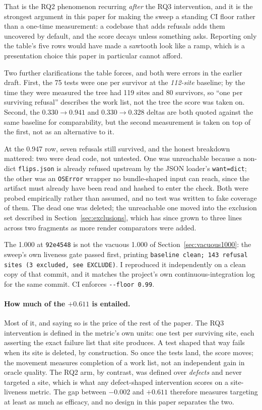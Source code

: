 \documentclass[11pt]{article}
\begin{document}
That is the RQ2 phenomenon recurring \emph{after} the RQ3 intervention, and it is the
strongest argument in this paper for making the sweep a standing CI floor rather than a
one-time measurement: a codebase that adds refusals adds them uncovered by default, and the
score decays unless something asks. Reporting only the table's five rows would have made a
sawtooth look like a ramp, which is a presentation choice this paper in particular cannot
afford.

Two further clarifications the table forces, and both were errors in the earlier draft.
First, the 75 tests were one per survivor at the \emph{112-site} baseline; by the time they were measured
the tree had 119 sites and 80 survivors, so ``one per surviving refusal'' describes the work
list, not the tree the score was taken on. Second, the $0.330 \rightarrow 0.941$ and
$0.330 \rightarrow 0.328$ deltas are both quoted against the same baseline for comparability,
but the second measurement is taken on top of the first, not as an alternative to it.

At the 0.947 row, seven refusals still survived, and the honest breakdown mattered: two were
dead code, not untested. One was unreachable because a non-dict \texttt{flips.json} is already
refused upstream by the JSON loader's \texttt{want=dict}; the other was an \texttt{OSError}
wrapper no bundle-shaped input can reach, since the artifact must already have been read and
hashed to enter the check. Both were probed empirically rather than assumed, and no test was
written to fake coverage of them. The dead one was deleted; the unreachable one moved into the
exclusion set described in Section~\ref{sec:exclusions}, which has since grown to three lines
across two fragments as more render comparators were added.

The 1.000 at \texttt{92e4548} is not the vacuous 1.000 of Section~\ref{sec:vacuous1000}: the
sweep's own liveness gate passed first, printing \texttt{baseline clean; 143 refusal sites (3
excluded, see EXCLUDE)}. I reproduced it independently on a clean copy of that commit, and it
matches the project's own continuous-integration log for the same commit. CI enforces
\texttt{-{}-floor 0.99}.

\paragraph{How much of the $+0.611$ is entailed.} Most of it, and saying so is the price of
the rest of the paper. The RQ3 intervention is defined in the metric's own units: one test
per surviving site, each asserting the exact failure list that site produces. A test shaped
that way fails when its site is deleted, by construction. So once the tests land, the score
moves; the movement measures completion of a work list, not an independent gain in oracle
quality. The RQ2 arm, by contrast, was defined over \emph{defects} and never targeted a
site, which is what any defect-shaped intervention scores on a site-liveness metric. The
gap between $-0.002$ and $+0.611$ therefore measures targeting at least as much as efficacy,
and no design in this paper separates the two.
\end{document}
